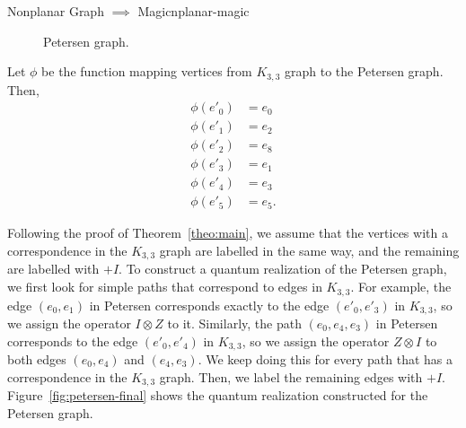\documentclass{llncs}
\begin{document}
\begin{tcbexample}{Nonplanar Graph \(\implies\) Magic}{nplanar-magic}
\begin{figure}[H]
\begin{subfigure}{0.475\textwidth}
\begin{center}
      \end{center}
      \caption{}
    \end{subfigure}
    \caption{Petersen graph.\label{fig:petersen}}
  \end{figure}

  Let \(\phi\) be the function mapping vertices from \(K_{3, 3}\)
  graph to the Petersen graph. Then,
  \begin{align*}
    \phi(e'_{0}) &= e_{0} \\
    \phi(e'_{1}) &= e_{2} \\
    \phi(e'_{2}) &= e_{8} \\
    \phi(e'_{3}) &= e_{1} \\
    \phi(e'_{4}) &= e_{3} \\
    \phi(e'_{5}) &= e_{5}.
  \end{align*}

  Following the proof of Theorem~\ref{theo:main}, we assume that the
  vertices with a correspondence in the \(K_{3, 3}\) graph are
  labelled in the same way, and the remaining are labelled with
  \(+I\).  To construct a quantum realization of the Petersen graph,
  we first look for simple paths that correspond to edges in
  \(K_{3, 3}\). For example, the edge \((e_{0}, e_{1})\) in Petersen
  corresponds exactly to the edge \((e'_{0}, e'_{3})\) in
  \(K_{3, 3}\), so we assign the operator \(I \otimes Z\) to
  it. Similarly, the path \((e_{0}, e_{4}, e_{3})\) in Petersen
  corresponds to the edge \((e'_{0}, e'_{4})\) in \(K_{3, 3}\), so we
  assign the operator \(Z \otimes I\) to both edges \((e_{0}, e_{4})\)
  and \((e_{4}, e_{3})\). We keep doing this for every path that has a
  correspondence in the \(K_{3, 3}\) graph. Then, we label the
  remaining edges with \(+I\). Figure~\ref{fig:petersen-final} shows
  the quantum realization constructed for the Petersen graph.

  \begin{figure}[H]
    \begin{center}
\end{center}
\end{figure}
\end{tcbexample}
\end{document}
